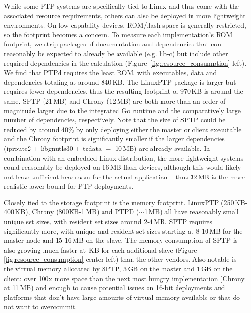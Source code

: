 While some PTP systems are specifically tied to Linux and thus come with the associated resource requirements, others can also be deployed in more lightweight environments. On low capability devices, ROM/flash space is generally restricted, so the footprint becomes a concern. To measure each implementation's ROM footprint, we strip packages of documentation and dependencies that can reasonably be expected to already be available (e.g. lib-c) but include other required dependencies in the calculation (Figure~\ref{fig:resource_consumption} left).
We find that PTPd requires the least ROM, with executables, data and dependencies totaling at around 840\,KB. The LinuxPTP package is larger but requires fewer dependencies, thus the resulting footprint of 970\,KB is around the same. SPTP (21\,MB) and Chrony (12\,MB) are both more than an order of magnitude larger due to the integrated Go runtime and the comparatively large number of dependencies, respectively. Note that the size of SPTP could be reduced by around 40\% by only deploying either the master or client executable and the Chrony footprint is significantly smaller if the larger dependencies (iproute2 + libgnutls30 + tzdata $=$ 10\,MB) are already available.
In combination with an embedded Linux distribution, the more lightweight systems could reasonably be deployed on 16\,MB flash devices, although this would likely not leave sufficient headroom for the actual application -- thus 32\,MB is the more realistic lower bound for PTP deployments.

Closely tied to the storage footprint is the memory footprint. LinuxPTP (250\,KB-400\,KB), Chrony (800\~KB-1\,MB) and PTPD ($\sim$1\,MB) all have reasonably small unique set sizes, with resident set sizes around 2-4\,MB. SPTP requires significantly more, with unique and resident set sizes starting at 8-10\,MB for the master node and 15-16\,MB on the slave. The memory consumption of SPTP is also growing much faster at \,KB for each additional slave (Figure \ref{fig:resource_consumption} center left) than the other vendors. Also notable is the virtual memory allocated by SPTP, 3\,GB on the master and 1\,GB on the client: over 100x more space than the next most hungry implementation (Chrony at 11\,MB) and enough to cause potential issues on 16-bit deployments and platforms that don't have large amounts of virtual memory available or that do not want to overcommit.


